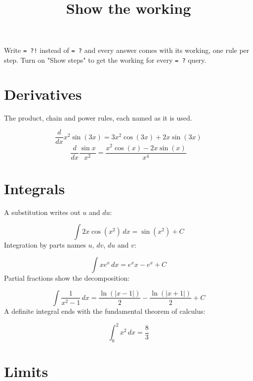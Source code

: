 \documentclass[11pt,a4paper]{article}
\title{Show the working}
\date{}
\theoremstyle{plain}
\theoremstyle{definition}
\theoremstyle{remark}
\begin{document}
\maketitle
Write \texttt{= ?!} instead of \texttt{= ?} and every answer comes with its working, one rule per step.
Turn on "Show steps" to get the working for every \texttt{= ?} query.

\section*{Derivatives}

The product, chain and power rules, each named as it is used.

\begin{equation*}
  \frac{d}{dx} x^2 \sin(3x) = 3 x^{2} \cos\left(3 x\right) + 2 x \sin\left(3 x\right)
\end{equation*}
\begin{equation*}
  \frac{d}{dx} \frac{\sin x}{x^2} = \frac{x^{2} \cos\left(x\right) - 2 x \sin\left(x\right)}{x^{4}}
\end{equation*}
\section*{Integrals}

A substitution writes out $u$ and $du$:

\begin{equation*}
  \int 2x \cos(x^2) \, dx = \sin\left(x^{2}\right) + C
\end{equation*}
Integration by parts names $u$, $dv$, $du$ and $v$:

\begin{equation*}
  \int x e^x \, dx = e^{x} x - e^{x} + C
\end{equation*}
Partial fractions show the decomposition:

\begin{equation*}
  \int \frac{1}{x^2 - 1} \, dx = \frac{\ln\left(\left|x - 1\right|\right)}{2} - \frac{\ln\left(\left|x + 1\right|\right)}{2} + C
\end{equation*}
A definite integral ends with the fundamental theorem of calculus:

\begin{equation*}
  \int_0^2 x^2 \, dx = \frac{8}{3}
\end{equation*}
\section*{Limits}
\end{document}
